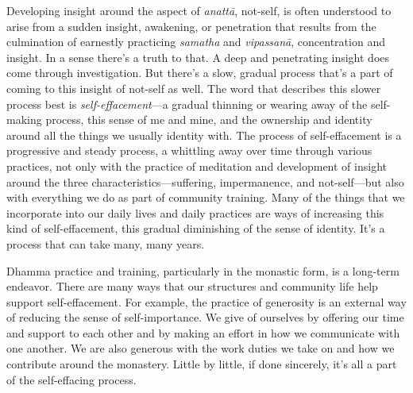 Developing insight around the aspect of \emph{anattā}, not-self, is 
often understood to arise from a sudden insight, awakening, or 
penetration that results from the culmination of earnestly practicing 
\emph{samatha} and \emph{vipassanā}, concentration and insight. In a 
sense there's a truth to that. A deep and penetrating insight does come 
through investigation. But there's a slow, gradual process that's a 
part of coming to this insight of not-self as well. The word that 
describes this slower process best is \emph{self-effacement}---a 
gradual thinning or wearing away of the self-making process, this sense 
of me and mine, and the ownership and identity around all the things we 
usually identity with. The process of self-effacement is a progressive 
and steady process, a whittling away over time through various 
practices, not only with the practice of meditation and development of 
insight around the three characteristics---suffering, impermanence, and 
not-self---but also with everything we do as part of community 
training. Many of the things that we incorporate into our daily lives 
and daily practices are ways of increasing this kind of 
self-effacement, this gradual diminishing of the sense of identity. 
It's a process that can take many, many years.

Dhamma practice and training, particularly in the monastic form, is a 
long-term endeavor. There are many ways that our structures and 
community life help support self-effacement. For example, the practice 
of generosity is an external way of reducing the sense of 
self-importance. We give of ourselves by offering our time and support 
to each other and by making an effort in how we communicate with one 
another. We are also generous with the work duties we take on and how 
we contribute around the monastery. Little by little, if done 
sincerely, it's all a part of the self-effacing process.

